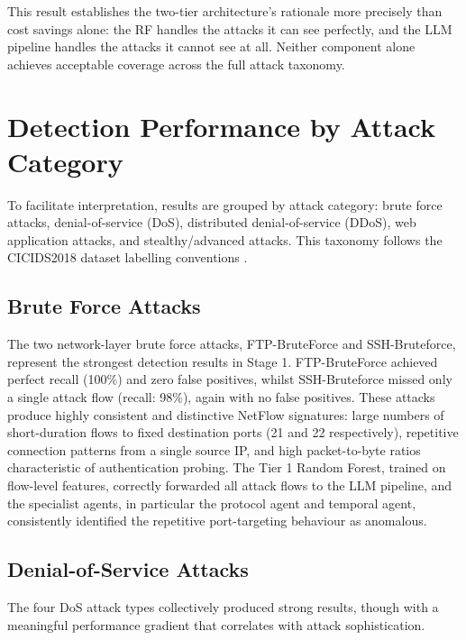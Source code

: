 \documentclass[../main.tex]{subfiles}
\begin{document}
This result establishes the two-tier architecture's rationale more precisely than cost savings alone: the RF handles the attacks it can see perfectly, and the LLM pipeline handles the attacks it cannot see at all. Neither component alone achieves acceptable coverage across the full attack taxonomy.

\section{Detection Performance by Attack Category}
\label{sec:detection-by-category}

To facilitate interpretation, results are grouped by attack category: brute force attacks, denial-of-service (DoS), distributed denial-of-service (DDoS), web application attacks, and stealthy/advanced attacks. This taxonomy follows the CICIDS2018 dataset labelling conventions \autocite{Sharafaldin2018}.

\subsection{Brute Force Attacks}
\label{sec:brute-force}

The two network-layer brute force attacks, FTP-BruteForce and SSH-Bruteforce, represent the strongest detection results in Stage 1. FTP-BruteForce achieved perfect recall (100\%) and zero false positives, whilst SSH-Bruteforce missed only a single attack flow (recall: 98\%), again with no false positives. These attacks produce highly consistent and distinctive NetFlow signatures: large numbers of short-duration flows to fixed destination ports (21 and 22 respectively), repetitive connection patterns from a single source IP, and high packet-to-byte ratios characteristic of authentication probing. The Tier 1 Random Forest, trained on flow-level features, correctly forwarded all attack flows to the LLM pipeline, and the specialist agents, in particular the protocol agent and temporal agent, consistently identified the repetitive port-targeting behaviour as anomalous.

\subsection{Denial-of-Service Attacks}
\label{sec:dos-attacks}

The four DoS attack types collectively produced strong results, though with a meaningful performance gradient that correlates with attack sophistication.
\end{document}
